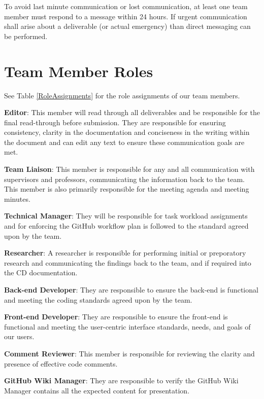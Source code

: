 \documentclass{article}
\begin{document}
To avoid last minute communication or lost communication, at least one team member must 
respond to a message within 24 hours. If urgent communication shall arise about a 
deliverable (or actual emergency) than direct messaging can be performed.

\section{Team Member Roles}

See Table \ref{RoleAssignments} for the role assignments of our team members.

\textbf{Editor}: This member will read through all deliverables and be responsible for 
the final read-through before submission. They are responsible for ensuring 
consistency, clarity in the documentation and conciseness in the writing within the 
document and can edit any text to ensure these communication goals are met.

\textbf{Team Liaison}: This member is responsible for any and all communication with 
supervisors and professors, communicating the information back to the team. This 
member is also primarily responsible for the meeting agenda and meeting minutes.

\textbf{Technical Manager}: They will be responsible for task 
workload assignments and for enforcing the GitHub workflow plan is followed to the 
standard agreed upon by the team.

\textbf{Researcher}: A researcher is responsible for performing initial or preporatory 
research and communicating the findings back to the team, and if required into the CD 
documentation.

\textbf{Back-end Developer}: They are responsible to ensure the back-end is functional 
and meeting the coding standards agreed upon by the team.

\textbf{Front-end Developer}: They are responsible to ensure the front-end is functional 
and meeting the user-centric interface standards, needs, and goals of our users.

\textbf{Comment Reviewer}: This member is responsible for reviewing the clarity and 
presence of effective code comments.

\textbf{GitHub Wiki Manager}: They are responsible to verify the GitHub Wiki Manager 
contains all the expected content for presentation.
\end{document}
